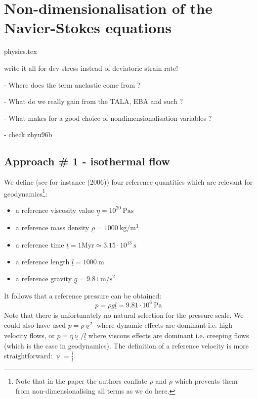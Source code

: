 \documentclass[a4paper,11pt]{article}
\begin{document}
\tableofcontents

\section{Non-dimensionalisation of the Navier-Stokes equations}\label{ss:nondim}
\begin{flushright} {\tiny {\color{gray} physics.tex}} \end{flushright}



{\color{red} write it all for dev stress instead of deviatoric strain rate!}

- Where does the term anelastic come from ?

- What do we really gain from the TALA, EBA and such ? 

- What makes for a good choice of nondimensionalisation variables ?

- check zhyu96b

\subsection{Approach \# 1 - isothermal flow}

We define (see for instance \cite{maqs06} (2006)) four reference 
quantities which are relevant for geodynamics\footnote{Note that in the paper 
the authors conflate $\rho$ and $\tilde{\rho}$ which prevents them from non-dimensionalising all terms as we do here.}:
\begin{itemize}
\item a reference viscosity value $\underline{\eta}=10^{20}~\si{\pascal\second}$
\item a reference mass density $\underline{\rho}=1000~\si{\kg\per\cubic\metre}$
\item a reference time $\underline{t}=1\text{Myr}\simeq 3.15\cdot 10^{13}~\si{\second}$
\item a reference length $\underline{l}=1000~\si{\metre}$
\item a reference gravity $\underline{g}=9.81~\si{\metre\per\square\second}$
\end{itemize}
It follows that a reference pressure can be obtained:
\[
\underline{p}=\underline{\rho} \underline{g} \underline{l} = 9.81\cdot 10^6~\si{\pascal}
\]
Note that there is unfortunately no natural selection for the pressure scale. 
We could also have used $\underline{p}=\underline{\rho}\underline{\upnu}^2$ 
where dynamic effects are dominant i.e. high velocity flows,
or $\underline{p}=\underline{\eta}\underline{\upnu}/\underline{l}$ 
where viscous effects are dominant i.e. creeping flows (which 
is the case in geodynamics).
The definition of a reference velocity is more straightforward: $\underline{\upnu} = \frac{\underline{l}}{\underline{t}}$. %
\end{document}
